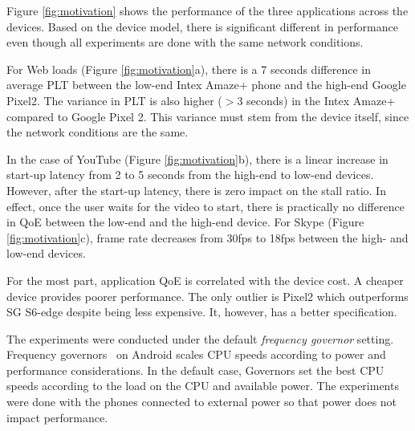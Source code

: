 Figure \ref{fig:motivation} shows the performance of the three applications across the devices. Based on the device model, there is significant different in performance even though all experiments
are done with the same network conditions. 

For Web loads (Figure \ref{fig:motivation}a), there is a 7 seconds difference in average PLT between the low-end Intex Amaze+ phone and the high-end Google Pixel2. The variance in PLT is also higher ($>$3 seconds) in the Intex Amaze+ compared to Google Pixel 2. This variance must stem from the device itself, since the network conditions are the same.

In the case of YouTube (Figure \ref{fig:motivation}b), there is a linear increase 
in start-up latency from 2 to 5 seconds from the high-end to low-end devices. However, after the start-up latency, there is zero impact on the stall ratio. In effect, once the user waits for the video to start, there is practically no difference in QoE between the low-end and the high-end device. For Skype (Figure \ref{fig:motivation}c), frame rate decreases from 30fps to 18fps between the high- and low-end devices.

For the most part, application QoE is correlated with the device cost.  A
cheaper device provides poorer performance. The only outlier is Pixel2 
which outperforms SG S6-edge despite being less expensive. It, however,
has a better specification. 

The experiments were conducted under the default {\em frequency governor} setting. 
Frequency governors~\cite{ad-governors} on 
Android scales CPU speeds according to power and performance considerations. In the default case, 
Governors set the best CPU speeds according to the load on the CPU and available power. 
The experiments were done with the phones connected to external power so that
power does not impact performance. 


